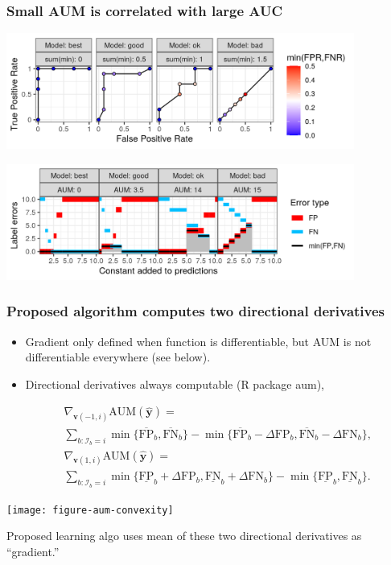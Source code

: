 \documentclass[t]{beamer}
\begin{document}
\begin{frame}
  \frametitle{Small AUM is correlated with large AUC} 
  
  \includegraphics[height=1.5in]{figure-more-than-one-binary-dots}

  \includegraphics[height=1.5in]{figure-more-than-one-binary-aum}
  
\end{frame}

\begin{frame}
  \frametitle{Proposed algorithm computes two directional derivatives }

  \begin{itemize}
  \item Gradient only defined when function is differentiable, but AUM
    is not differentiable everywhere (see below).
  \item Directional derivatives always computable (R package aum),
  \end{itemize}
\begin{eqnarray*}
  &&\nabla_{\mathbf v(-1,i)} \text{AUM}(\mathbf{\hat y}) = \\
  &&\sum_{b: \mathcal I_b = i}
  \min\{
  \overline{\text{FP}}_b , 
  \overline{\text{FN}}_b 
  \}
  -
  \min\{
  \overline{\text{FP}}_b - \Delta\text{FP}_b, 
  \overline{\text{FN}}_b - \Delta\text{FN}_b
  \},\\
  &&\nabla_{\mathbf v(1,i)} \text{AUM}(\mathbf{\hat y}) = \\
  &&\sum_{b: \mathcal I_b = i}
  \min\{
  \underline{\text{FP}}_b + \Delta\text{FP}_b, 
  \underline{\text{FN}}_b + \Delta\text{FN}_b
  \}
  -
  \min\{
  \underline{\text{FP}}_b , 
  \underline{\text{FN}}_b 
     \}.
\end{eqnarray*}  

\parbox{2in}{ \texttt{[image: figure-aum-convexity]} }
\parbox{2in}{ Proposed learning algo uses mean of these two
  directional derivatives as ``gradient.''  }

\end{frame}
\end{document}
